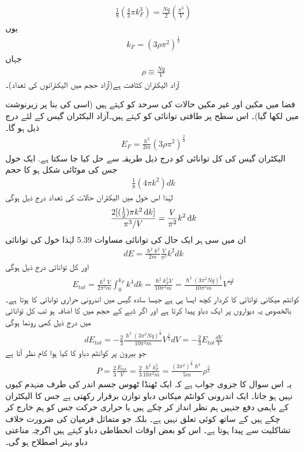 	\begin{align*}
		\frac{1}{8}(\frac{4}{3} \pi k^{3}_F) =  \frac{Nq}{2}(\frac{\pi^3}{V})
	\end{align*}
یوں
\begin{align}
	k_F =(3\rho\pi^{2})^{\frac{1}{3}}
\end{align}
جہاں
\begin{align}
	\rho \equiv \frac{Nq}{V}
\end{align}
آزاد الیکٹران کثافت ہے(آزاد حجم میں الیکٹرانوں کی تعداد)۔

  فضا میں مکین اور غیر مکین حالات کی سرحد کو  کہتے ہیں (اسی کی بنا پر  زیرنوشت میں  لکھا گیا)۔ اس سطح پر طاقتی توانائی کو   کہتے ہیں۔آزاد الیکٹران گیس کے لئے درج ذیل ہو گا۔
\begin{align}
	E_F = \frac{h^{2}}{2m}(3\rho\pi^{2})^{\frac{2}{3}}
\end{align}
الیکٹران گیس کی کل توانائی کو درج ذیل طریقہ سے حل کیا جا سکتا ہے. ایک خول جس کی موٹائی  شکل    ہو کا حجم
\begin{align*}
	\frac{1}{8}(4\pi k^{2})dk
\end{align*}
لہٰذا اس خول میں الیکٹران حالات کی تعداد درج ذیل ہوگی
\begin{align*}
	\frac{2[(\frac{1}{2})\pi k^{2}\dif k]}{\pi^{3}/V} = \frac{V}{\pi^{2}}k^{2}\dif k
\end{align*}
ان میں سی ہر ایک حال کی توانائی  مساوات \num{5.39} لہٰذا خول کی توانائی
\begin{align}
	dE = \frac{\hslash^{2}k^2}{2m} \frac{V}{\pi^{2}}k^{2}dk
\end{align}
اور کل توانائی درج ذیل ہوگی
\begin{align}
	E_{tot}=\frac{\hslash^{2}V}{2\pi^{2}m}\int_{0}^{k_F}k^{4}dk = \frac{\hslash^{2}k^{5}_F V}{10\pi^{2}m} = \frac{\hslash^{2}(3\pi^{2}Nq)^{\frac{5}{3}}}{10\pi^{2}m}V^{\frac{-2}{3}}
\end{align}
کوانٹم میکانی توانائی کا کردار کچھ ایسا ہی ہے جیسا سادہ گیس میں اندرونی حراری توانائی  کا ہوتا ہے۔ بالخصوص یہ دیواروں پر ایک دباو پیدا کرتا ہے اور اگر ڈبے کے حجم میں  کا اضافہ ہو تب کل توانائی میں درج ذیل کمی رونما ہوگی
\begin{align*}
	dE_{tot} = -\frac{2}{3}\frac{\hslash^2(3\pi^{2}Nq)^{\frac{5}{3}}}{10\pi^{2}m}V^{\frac{5}{3}}dV = -\frac{2}{3}E_{tot}\frac{dV}{V}
\end{align*}
جو بیرون پر کوانٹم دباو  کا کیا ہوا کام  نظر آتا ہے
\begin{align}
	P = \frac{2}{3}\frac{E_{tot}}{V} = \frac{2}{3}\frac{\hslash^{2}k^{5}_F}{10\pi^{2}m} = \frac{(3\pi^{2})^{\frac{2}{3}}\hslash^{2}}{5m}\rho^{\frac{5}{3}}
\end{align}
یہ اس سوال کا جزوی جواب ہے کہ ایک ٹھنڈا ٹھوس جسم اندر کی طرف منہدم کیوں نہیں ہو جاتا۔ ایک اندرونی کوانٹم میکانی دباو توازن برقرار رکھتی ہے جس کا الیکٹران کے  باہمی دفع جنہیں ہم نظر انداز کر چکے ہیں یا حراری حرکت جس کو ہم خارج کر چکے ہیں کے ساتھ کوئی تعلق نہیں ہے۔ بلکہ جو متماثل فرمیان کی ضرورت خلاف تشاکلیت سے پیدا ہوتا ہے۔ اس کو بعض اوقات انحطاطی دباو کہتے ہیں اگرچہ    مناعتی  دباو بہتر اصطلاح ہو گی۔

